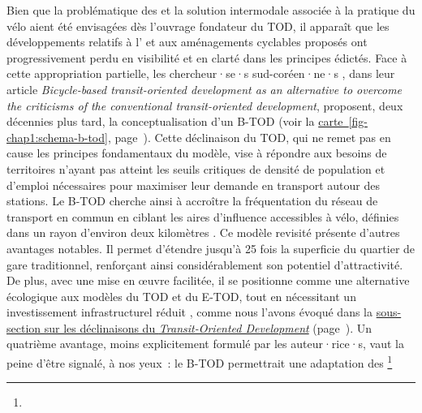 \begin{refsegment}
Bien que la problématique des  et la solution intermodale associée à la pratique du vélo aient été envisagées dès l’ouvrage fondateur du \acrshort{TOD}, il apparaît que les développements relatifs à l’ et aux aménagements cyclables proposés ont progressivement perdu en visibilité et en clarté dans les principes édictés. Face à cette appropriation partielle, les chercheur·se·s sud-coréen·ne·s \textcolor{blue}{\textcite[979]{lee_bicycle-based_2016}}, dans leur article \textsl{Bicycle-based transit-oriented development as an alternative to overcome the criticisms of the conventional transit-oriented development}, proposent, deux décennies plus tard, la conceptualisation d’un \acrfull{B-TOD} (voir la \hyperref[fig-chap1:schema-b-tod]{carte~\ref{fig-chap1:schema-b-tod}}, page~\pageref{fig-chap1:schema-b-tod}). Cette déclinaison du \acrshort{TOD}, qui ne remet pas en cause les principes fondamentaux du modèle, vise à répondre aux besoins de territoires n’ayant pas atteint les seuils critiques de densité de population et d’emploi nécessaires pour maximiser leur demande en transport autour des stations. Le \acrshort{B-TOD} cherche ainsi à accroître la fréquentation du réseau de transport en commun en ciblant les aires d’influence accessibles à vélo, définies dans un rayon d’environ deux kilomètres \textcolor{blue}{\autocite[979]{lee_bicycle-based_2016}}. Ce modèle revisité présente d'autres avantages notables. Il permet d’étendre jusqu'à 25 fois la superficie du quartier de gare traditionnel, renforçant ainsi considérablement son potentiel d’attractivité. De plus, avec une mise en œuvre facilitée, il se positionne comme une alternative écologique aux modèles du \acrshort{TOD} et du \acrshort{E-TOD}, tout en nécessitant un investissement infrastructurel réduit \textcolor{blue}{\autocite[979, 983]{lee_bicycle-based_2016}}, comme nous l’avons évoqué dans la \hyperref[chap1:tod-presentation-generale-declinaisons-hybrids]{sous-section sur les déclinaisons du \textsl{Transit-Oriented Development}} (page~\pageref{chap1:tod-presentation-generale-declinaisons-hybrids}). Un quatrième avantage, moins explicitement formulé par les auteur·rice·s, vaut la peine d'être signalé, à nos yeux~: le \acrshort{B-TOD} permettrait une adaptation des \footnote{
}
\end{refsegment}
